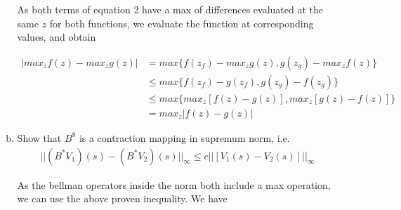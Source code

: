 \documentclass{exam}
\begin{document}
\begin{problem}
\begin{enumerate}
\begin{enumerate}[(a)]
\begin{solutionorlines}[2in]
            As both terms of equation 2 have a max of differences evaluated at the same $z$ for both functions, we evaluate the function at corresponding values, and obtain
            
            \begin{align}
                |max_z f(z) - max_z g(z)| &= max \{ f(z_f) - max_z g(z), g(z_g) - max_z f(z) \} \\
                & \leq max \{ f(z_f) - g(z_f), g(z_g) - f(z_g) \} \\
                & \leq max \{ max_z [f(z) - g(z)], max_z [g(z) - f(z)] \} \\
                &= max_z |f(z) - g(z)|
            \end{align}
            
            \end{solutionorlines}
        \item
        Show that $B^{8}$ is a contraction mapping in supremum norm, i.e.
        \begin{align*}
            || (B^{*}V_1)(s) - (B^{*}V_2)(s) ||_{\infty} \le c ||  [V_1(s) -  V_2(s) ] ||_{\infty}
        \end{align*}
        
            \begin{solutionorlines}[2in] 
            
            As the bellman operators inside the norm both include a max operation, we can use the above proven inequality. We have 
            

\end{solutionorlines}
\end{enumerate}
\end{enumerate}
\end{problem}
\end{document}
